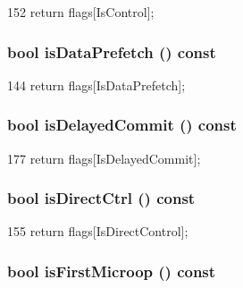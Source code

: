 \begin{DoxyCode}
152 { return flags[IsControl]; }
\end{DoxyCode}
\hypertarget{classStaticInst_abe301c4b09b8eb65bc2203905b1abf53}{
\subsubsection[{isDataPrefetch}]{\setlength{\rightskip}{0pt plus 5cm}bool isDataPrefetch () const}}
\label{classStaticInst_abe301c4b09b8eb65bc2203905b1abf53}



\begin{DoxyCode}
144 { return flags[IsDataPrefetch]; }
\end{DoxyCode}
\hypertarget{classStaticInst_aebb2ebf9a7a910fcd247833ab88843b3}{
\subsubsection[{isDelayedCommit}]{\setlength{\rightskip}{0pt plus 5cm}bool isDelayedCommit () const}}
\label{classStaticInst_aebb2ebf9a7a910fcd247833ab88843b3}



\begin{DoxyCode}
177 { return flags[IsDelayedCommit]; }
\end{DoxyCode}
\hypertarget{classStaticInst_ac218ba4230a8cd92999948288a54e14f}{
\subsubsection[{isDirectCtrl}]{\setlength{\rightskip}{0pt plus 5cm}bool isDirectCtrl () const}}
\label{classStaticInst_ac218ba4230a8cd92999948288a54e14f}



\begin{DoxyCode}
155 { return flags[IsDirectControl]; }
\end{DoxyCode}
\hypertarget{classStaticInst_a937b23736e22f67d6b168c0c029deec4}{
\subsubsection[{isFirstMicroop}]{\setlength{\rightskip}{0pt plus 5cm}bool isFirstMicroop () const}}
\label{classStaticInst_a937b23736e22f67d6b168c0c029deec4}



